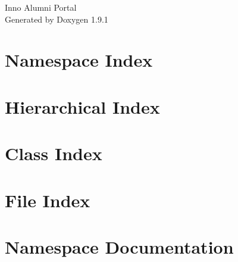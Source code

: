 \let\mypdfximage\pdfximage\def\pdfximage{\immediate\mypdfximage}\documentclass[twoside]{book}
\newcommand{\+}{\discretionary{\mbox{\scriptsize$\hookleftarrow$}}{}{}}
\newcommand{\clearemptydoublepage}{%
  \newpage{\pagestyle{empty}\cleardoublepage}%
}
\begin{document}
\raggedbottom

\hypersetup{pageanchor=false,
             bookmarksnumbered=true,
             pdfencoding=unicode
            }
\begin{titlepage}
\vspace*{7cm}
\begin{center}%
{\Large Inno Alumni Portal }\\
\vspace*{1cm}
{\large Generated by Doxygen 1.9.1}\\
\end{center}
\end{titlepage}
\clearemptydoublepage
{}
\tableofcontents
\clearemptydoublepage
{}
\hypersetup{pageanchor=true}

\chapter{Namespace Index}

\chapter{Hierarchical Index}

\chapter{Class Index}

\chapter{File Index}

\chapter{Namespace Documentation}























\end{document}
